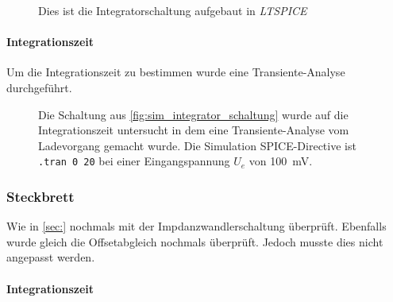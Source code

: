 \documentclass[12pt,english,ngerman]{scrartcl}
\begin{document}
\begin{figure}[H]
  \centering
  \caption{Dies ist die Integratorschaltung aufgebaut in \textit{LTSPICE}}
  \label{fig:sim_integrator_schaltung}
\end{figure}

\paragraph{Integrationszeit}
Um die Integrationszeit zu bestimmen wurde eine Transiente-Analyse durchgeführt.


\begin{figure}[H]
  \centering
  \caption{Die Schaltung aus \autoref{fig:sim_integrator_schaltung} wurde auf
  die Integrationszeit untersucht in dem eine Transiente-Analyse vom
  Ladevorgang gemacht wurde. Die Simulation SPICE-Directive ist \texttt{.tran 0 20} 
  bei einer Eingangspannung $U_e$ von \SI{100}{\milli\volt}.}
  \label{fig:sim_integrator_integrationszeit}
\end{figure}

\subsubsection{Steckbrett}
Wie in \autoref{sec:} nochmals mit der Impdanzwandlerschaltung überprüft.
Ebenfalls wurde gleich die Offsetabgleich nochmals überprüft. Jedoch musste
dies nicht angepasst werden.

\paragraph{Integrationszeit}
\end{document}
